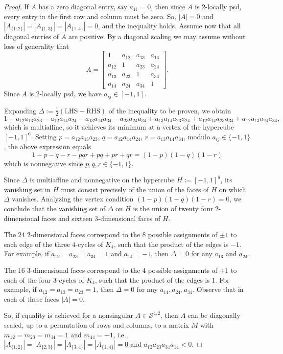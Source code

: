 \documentclass[reqno,hidelinks,11pt]{amsart}
\numberwithin{equation}{section}
\begin{document}
\begin{proof} 
    If $A$ has a zero diagonal entry, say $a_{11}=0$, then since $A$ is $2$-locally psd, every entry in the first row and column must be zero. So, $|A|=0$ and $|A_{\{1,2\}}|=|A_{\{1,3\}}|=|A_{\{1,4\}}|=0$, and the inequality holds. Assume now that all diagonal entries of $A$ are positive. By a diagonal scaling we may assume without loss of generality that 
    \[
    A=\begin{bmatrix}
        1 & a_{12} & a_{13} & a_{14}\\
        a_{12} & 1 & a_{23} & a_{24}\\
        a_{13} & a_{23} & 1 & a_{34}\\
        a_{14} & a_{24} & a_{34} & 1
    \end{bmatrix}.
    \]
    Since $A$ is $2$-locally psd, we have $a_{ij}\in[-1,1]$.
    
    Expanding $\Delta:=\frac12(\text{LHS}-\text{RHS})$ of the inequality to be proven, we obtain
    \[
    1-a_{12}a_{13}a_{23}-a_{12}a_{14}a_{24}-a_{13}a_{14}a_{34}-a_{23}a_{24}a_{34}+a_{13}a_{14}a_{23}a_{24}+a_{12}a_{14}a_{23}a_{34}+a_{12}a_{13}a_{24}a_{34},
    \]
    which is multiaffine, so it achieves its minimum at a vertex of the hypercube $[-1,1]^6$. Setting $p=a_{12}a_{13}a_{23}$, $q=a_{12}a_{14}a_{24}$, $r=a_{13}a_{14}a_{34}$, modulo $a_{ij}\in\{-1,1\}$, the above expression equals \[
    1-p-q-r-pqr+pq+pr+qr=(1-p)(1-q)(1-r)
    \] which is nonnegative since $p,q,r\in\{-1,1\}$.

    Since $\Delta$ is multiaffine and nonnegative on the hypercube $H:=[-1,1]^6$, its vanishing set in $H$ must consist precisely of the union of the faces of $H$ on which $\Delta$ vanishes. Analyzing the vertex condition $(1-p)(1-q)(1-r)=0$, we conclude that the vanishing set of $\Delta$ on $H$ is the union of twenty four $2$-dimensional faces and sixteen $3$-dimensional faces of $H$.

    The $24$ $2$-dimensional faces correspond to the $8$ possible assignments of $\pm1$ to each edge of the three $4$-cycles of $K_4$, such that the product of the edges is $-1$. For example, if $a_{12}=a_{23}=a_{34}=1$ and $a_{14}=-1$, then $\Delta=0$ for any $a_{13}$ and $a_{24}$.

    The $16$ $3$-dimensional faces correspond to the $4$ possible assignments of $\pm1$ to each of the four $3$-cycles of $K_4$, such that the product of the edges is $1$. For example, if $a_{12}=a_{13}=a_{23}=1$, then $\Delta=0$ for any $a_{14},a_{24},a_{34}$. Observe that in each of these faces $|A|=0$.

    So, if equality is achieved for a nonsingular $A\in\mathcal{S}^{4,2}$, then $A$ can be diagonally scaled, up to a permutation of rows and columns, to a matrix $M$ with $m_{12}=m_{23}=m_{34}=1$ and $m_{14}=-1$, i.e., $|A_{\{1,2\}}|=|A_{\{2,3\}}|=|A_{\{3,4\}}|=|A_{\{1,4\}}|=0$ and $a_{12}a_{23}a_{34}a_{14}<0$.
\end{proof}
\end{document}
